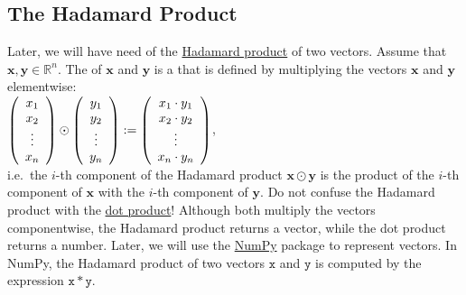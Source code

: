 \subsection{The Hadamard Product}
Later, we will have need of the \href{https://en.wikipedia.org/wiki/Hadamard_product_(matrices)}{Hadamard product} 
of two vectors.  Assume that $\mathbf{x}, \mathbf{y} \in \mathbb{R}^n$.  The  of
$\mathbf{x}$ and $\mathbf{y}$ is a  that is defined by multiplying the vectors $\mathbf{x}$ and $\mathbf{y}$ elementwise:
\\[0.2cm]
\hspace*{1.3cm}
$\left(
  \begin{array}[c]{c}
    x_1 \\
    x_2 \\
    \vdots \\
    x_n
  \end{array}
\right) \odot
\left(
  \begin{array}[c]{c}
    y_1 \\
    y_2 \\
    \vdots \\
    y_n
  \end{array}
\right) := 
\left(
  \begin{array}[c]{c}
    x_1 \cdot y_1 \\
    x_2 \cdot y_2 \\
    \vdots \\
    x_n \cdot y_n
  \end{array}
\right)
$,
\\[0.2cm]
i.e.~the $i$-th component of the Hadamard product $\mathbf{x} \odot \mathbf{y}$ is the product of the $i$-th
component of $\mathbf{x}$ with the $i$-th component of $\mathbf{y}$.  Do not confuse the Hadamard product with
the \href{https://en.wikipedia.org/wiki/Dot_product}{dot product}!  Although both multiply the vectors
componentwise, the Hadamard product returns a vector, while the dot product returns a number.  Later, we will
use the \href{http://www.numpy.org}{NumPy} package to represent vectors.  In NumPy, the Hadamard product of two
vectors $\mathtt{x}$ and $\mathtt{y}$ is computed by the expression $\mathtt{x} * \mathtt{y}$.

